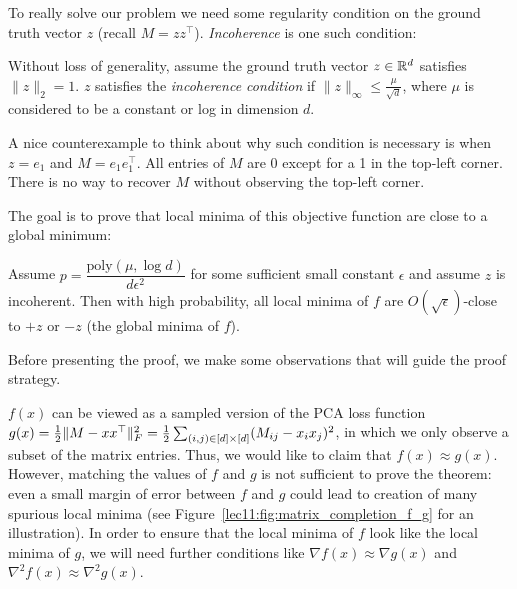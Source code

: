 To really solve our problem we need some regularity condition on the ground truth vector $z$ (recall $M = zz^\top$). \textit{Incoherence} is one such condition:
\begin{definition}[Incoherence]
Without loss of generality, assume the ground truth vector $z\in\mathbb R^d$ satisfies $\|z\|_2 = 1$. $z$ satisfies the \textit{incoherence condition} if $\|z\|_{\infty} \leq \frac{\mu}{\sqrt{d}}$, where $\mu$ is considered to be a constant or log in dimension $d$. 
\end{definition}

\begin{remark}
A nice counterexample to think about why such condition is necessary is when $z = e_1$ and $M = e_1 e_1^\top$. All entries of $M$ are 0 except for a 1 in the top-left corner. There is no way to recover $M$ without observing the top-left corner.
\end{remark}

The goal is to prove that local minima of this objective function are close to a global minimum:

\begin{theorem}\label{lec11:thm:matrix-completion}
Assume $p = \dfrac{\textrm{poly}(\mu, \log d)}{d\epsilon^2}$ for some sufficient small constant $\epsilon$ and assume $z$ is incoherent. Then with high probability, all local minima of $f$ are $O(\sqrt{\epsilon})$-close to $+z$ or $-z$ (the global minima of $f$).
\end{theorem}

Before presenting the proof, we make some observations that will guide the proof strategy.

\begin{remark}
$f(x)$ can be viewed as a sampled version of the PCA loss function $g(x) = \frac{1}{2}\|M - xx^\top\|_F^2 = \frac{1}{2}\sum_{(i,j) \in [d]\times[d]} (M_{ij} - x_ix_j)^2$, in which we only observe a subset of the matrix entries. Thus, we would like to claim that $f(x) \approx g(x)$. However, matching the values of $f$ and $g$ is not sufficient to prove the theorem: even a small margin of error between $f$ and $g$ could lead to creation of many spurious local minima (see Figure~\ref{lec11:fig:matrix_completion_f_g} for an illustration). In order to ensure that the local minima of $f$ look like the local minima of $g$, we will need further conditions like $\nabla f(x) \approx \nabla g(x)$ and $\nabla^2 f(x) \approx \nabla^2 g(x)$.
\end{remark}

